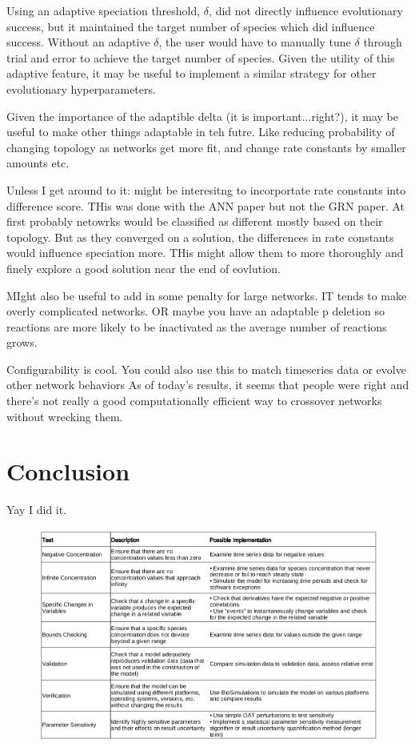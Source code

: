 \documentclass[12pt]{report}
\begin{document}
Using an adaptive speciation threshold, $\delta$, did not directly influence evolutionary success, but it maintained the target number of species which did influence success. Without an adaptive $\delta$, the user would have to manually tune $\delta$ through trial and error to achieve the target number of species. Given the utility of this adaptive feature, it may be useful to implement a similar strategy for other evolutionary hyperparameters.


Given the importance of the adaptible delta (it is important...right?), it may be useful to make other things adaptable in teh futre. Like reducing probability of changing topology as networks get more fit, and change rate constants by smaller amounts etc.

Unless I get around to it: might be interesitng to incorportate rate constants into difference score. THis was done with the ANN paper but not the GRN paper. At first probably netowrks would be classified as different mostly based on their topology. But as they converged on a solution, the differences in rate constants would influence speciation more. THis might allow them to more thoroughly and finely explore a good solution near the end of eovlution.

MIght also be useful to add in some penalty for large networks. IT tends to make overly complicated networks. OR maybe you have an adaptable p deletion so reactions are more likely to be inactivated as the average number of reactions grows.

Configurability is cool. 
You could also use this to match timeseries data or evolve other network behaviors
As of today's results, it seems that people were right and there's not really a good computationally efficient way to crossover networks without wrecking them.

\section{Conclusion}
Yay I did it.
\\


	


\begin{figure}
    \centering
    \includegraphics[width=19cm]{images/testSummary.png}
    \label{table:sensitivity}
\end{figure}





\end{document}
